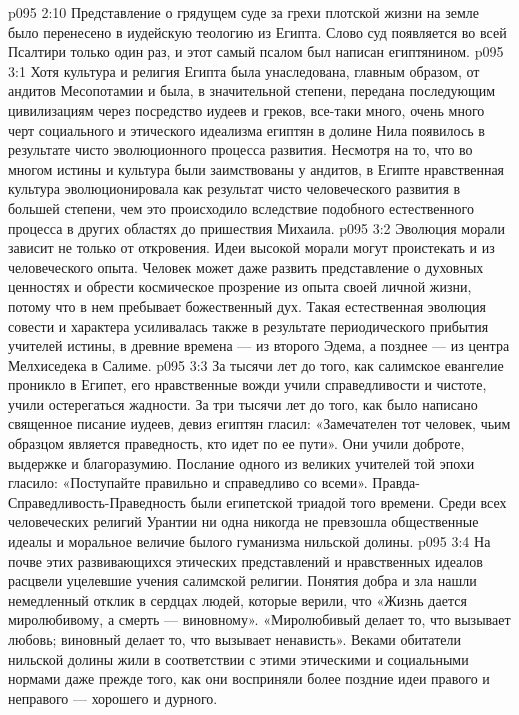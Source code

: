 \vs p095 2:10 Представление о грядущем суде за грехи плотской жизни на земле было перенесено в иудейскую теологию из Египта. Слово суд появляется во всей Псалтири только один раз, и этот самый псалом был написан египтянином.
\vs p095 3:1 Хотя культура и религия Египта была унаследована, главным образом, от андитов Месопотамии и была, в значительной степени, передана последующим цивилизациям через посредство иудеев и греков, все\hyp{}таки много, очень много черт социального и этического идеализма египтян в долине Нила появилось в результате чисто эволюционного процесса развития. Несмотря на то, что во многом истины и культура были заимствованы у андитов, в Египте нравственная культура эволюционировала как результат чисто человеческого развития в большей степени, чем это происходило вследствие подобного естественного процесса в других областях до пришествия Михаила.
\vs p095 3:2 Эволюция морали зависит не только от откровения. Идеи высокой морали могут проистекать и из человеческого опыта. Человек может даже развить представление о духовных ценностях и обрести космическое прозрение из опыта своей личной жизни, потому что в нем пребывает божественный дух. Такая естественная эволюция совести и характера усиливалась также в результате периодического прибытия учителей истины, в древние времена --- из второго Эдема, а позднее --- из центра Мелхиседека в Салиме.
\vs p095 3:3 За тысячи лет до того, как салимское евангелие проникло в Египет, его нравственные вожди учили справедливости и чистоте, учили остерегаться жадности. За три тысячи лет до того, как было написано священное писание иудеев, девиз египтян гласил: «Замечателен тот человек, чьим образцом является праведность, кто идет по ее пути». Они учили доброте, выдержке и благоразумию. Послание одного из великих учителей той эпохи гласило: «Поступайте правильно и справедливо со всеми». Правда\hyp{}Справедливость\hyp{}Праведность были египетской триадой того времени. Среди всех человеческих религий Урантии ни одна никогда не превзошла общественные идеалы и моральное величие былого гуманизма нильской долины.
\vs p095 3:4 На почве этих развивающихся этических представлений и нравственных идеалов расцвели уцелевшие учения салимской религии. Понятия добра и зла нашли немедленный отклик в сердцах людей, которые верили, что «Жизнь дается миролюбивому, а смерть --- виновному». «Миролюбивый делает то, что вызывает любовь; виновный делает то, что вызывает ненависть». Веками обитатели нильской долины жили в соответствии с этими этическими и социальными нормами даже прежде того, как они восприняли более поздние идеи правого и неправого --- хорошего и дурного.
